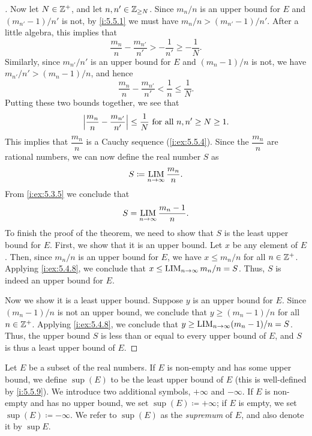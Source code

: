 \begin{proof}[]
  Now let \(N \in \mathbb{Z}^+\), and let \(n, n' \in \mathbb{Z}_{\geq N}\).
  Since \(m_n / n\) is an upper bound for \(E\) and \((m_{n'} - 1) / n'\) is not, by \cref{i:5.5.1} we must have \(m_n / n > (m_{n'} - 1) / n'\).
  After a little algebra, this implies that
  \[
    \dfrac{m_n}{n} - \dfrac{m_{n'}}{n'} > -\dfrac{1}{n'} \geq -\dfrac{1}{N}.
  \]
  Similarly, since \(m_{n'} / n'\) is an upper bound for \(E\) and \((m_n - 1) / n\) is not, we have \(m_{n'} / n' > (m_n - 1) / n\), and hence
  \[
    \dfrac{m_n}{n} - \dfrac{m_{n'}}{n'} < \dfrac{1}{n} \leq \dfrac{1}{N}.
  \]
  Putting these two bounds together, we see that
  \[
    \left\lvert\dfrac{m_n}{n} - \dfrac{m_{n'}}{n'}\right\rvert \leq \dfrac{1}{N} \text{ for all } n, n' \geq N \geq 1.
  \]
  This implies that \(\dfrac{m_n}{n}\) is a Cauchy sequence (\cref{i:ex:5.5.4}).
  Since the \(\dfrac{m_n}{n}\) are rational numbers, we can now define the real number \(S\) as
  \[
    S \coloneqq \operatorname*{LIM}_{n \to \infty} \dfrac{m_n}{n}.
  \]
  From \cref{i:ex:5.3.5} we conclude that
  \[
    S = \operatorname*{LIM}_{n \to \infty} \dfrac{m_n - 1}{n}.
  \]
  To finish the proof of the theorem, we need to show that \(S\) is the least upper bound for \(E\).
  First, we show that it is an upper bound.
  Let \(x\) be any element of \(E\).
  Then, since \(m_n / n\) is an upper bound for \(E\), we have \(x \leq m_n / n\) for all \(n \in \mathbb{Z}^+\).
  Applying \cref{i:ex:5.4.8}, we conclude that \(x \leq \operatorname*{LIM}_{n \to \infty} m_n / n = S\).
  Thus, \(S\) is indeed an upper bound for \(E\).

  Now we show it is a least upper bound.
  Suppose \(y\) is an upper bound for \(E\).
  Since \((m_n - 1) / n\) is not an upper bound, we conclude that \(y \geq (m_n - 1) / n\) for all \(n \in \mathbb{Z}^+\).
  Applying \cref{i:ex:5.4.8}, we conclude that \(y \geq \operatorname*{LIM}_{n \to \infty} (m_n - 1) / n = S\).
  Thus, the upper bound \(S\) is less than or equal to every upper bound of \(E\), and \(S\) is thus a least upper bound of \(E\).
\end{proof}

\begin{defn}[Supremum]\label{i:5.5.10}
  Let \(E\) be a subset of the real numbers.
  If \(E\) is non-empty and has some upper bound, we define \(\sup(E)\) to be the least upper bound of \(E\)
  (this is well-defined by \cref{i:5.5.9}).
  We introduce two additional symbols, \(+\infty\) and \(-\infty\).
  If \(E\) is non-empty and has no upper bound, we set \(\sup(E) \coloneqq +\infty\);
  if \(E\) is empty, we set \(\sup(E) \coloneqq -\infty\).
  We refer to \(\sup(E)\) as the \emph{supremum} of \(E\), and also denote it by \(\sup E\).
\end{defn}

